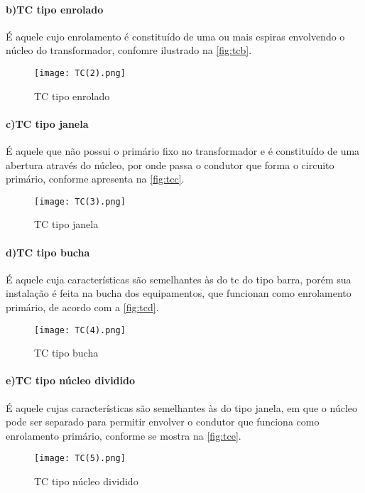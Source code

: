 				\paragraph*{b)\indent TC tipo enrolado}
					É aquele cujo enrolamento é constituído de uma ou mais espiras envolvendo o núcleo do transformador, confomre ilustrado na \autoref{fig:tcb}.
					\begin{figure}[htb]
						\caption{TC tipo enrolado}
						\centering
						\texttt{[image: TC(2).png]}
						\label{fig:tcb}
					\end{figure}
				\paragraph*{c)\indent TC tipo janela}
					É aquele que não possui o primário fixo no transformador e é constituído de uma abertura através do núcleo, por onde passa o condutor que forma o circuito primário, conforme apresenta na \autoref{fig:tcc}.
					\begin{figure}[htb]
						\caption{TC tipo janela}
						\centering
						\texttt{[image: TC(3).png]}
						\label{fig:tcc}
					\end{figure}
				\paragraph*{d)\indent TC tipo bucha}
					É aquele cuja características são semelhantes às do tc do tipo barra, porém sua instalação é feita na bucha dos equipamentos, que funcionan como enrolamento primário, de acordo com a \autoref{fig:tcd}.
					\begin{figure}[htb]
						\caption{TC tipo bucha}
						\centering
						\texttt{[image: TC(4).png]}
						\label{fig:tcd}
					\end{figure}
				\paragraph*{e)\indent TC tipo núcleo dividido}
					É aquele cujas características são semelhantes às do tipo janela, em que o núcleo pode ser separado para permitir envolver o condutor que funciona como enrolamento primário, conforme se mostra na \autoref{fig:tce}.
					\begin{figure}[htb]
						\caption{TC tipo núcleo dividido}
						\centering
						\texttt{[image: TC(5).png]}
						\label{fig:tce}
					\end{figure}
